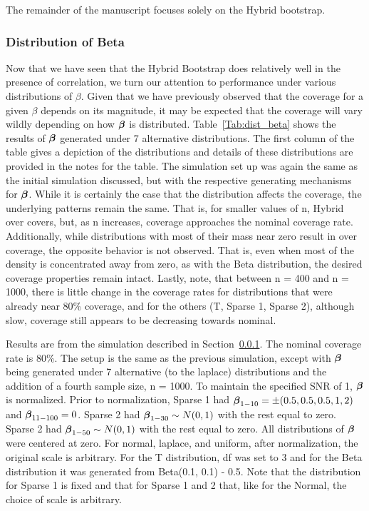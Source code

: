 The remainder of the manuscript focuses solely on the Hybrid bootstrap.

\subsubsection{Distribution of Beta}\label{Sec:Distribution}

Now that we have seen that the Hybrid Bootstrap does relatively well in the presence of correlation, we turn our attention to performance under various distributions of $\beta$. Given that we have previously observed that the coverage for a given $\beta$ depends on its magnitude, it may be expected that the coverage will vary wildly depending on how $\boldsymbol{\beta}$ is distributed. Table~\ref{Tab:dist_beta} shows the results of $\boldsymbol{\beta}$ generated under 7 alternative distributions. The first column of the table gives a depiction of the distributions and details of these distributions are provided in the notes for the table. The simulation set up was again the same as the initial simulation discussed, but with the respective generating mechanisms for $\boldsymbol{\beta}$. While it is certainly the case that the distribution affects the coverage, the underlying patterns remain the same. That is, for smaller values of n, Hybrid over covers, but, as n increases, coverage approaches the nominal coverage rate. Additionally, while distributions with most of their mass near zero result in over coverage, the opposite behavior is not observed. That is, even when most of the density is concentrated away from zero, as with the Beta distribution, the desired coverage properties remain intact. Lastly, note, that between n = 400 and n = 1000, there is little change in the coverage rates for distributions that were already near 80\% coverage, and for the others (T, Sparse 1, Sparse 2), although slow, coverage still appears to be decreasing towards nominal.

\begin{table}[hbtp]
  \centering
  
  \caption{\label{Tab:dist_beta} Results are from the simulation described in Section~\ref{Sec:Distribution}. The nominal coverage rate is 80\%. The setup is the same as the previous simulation, except with $\boldsymbol{\beta}$ being generated under 7 alternative (to the laplace) distributions and the addition of a fourth sample size, n = 1000. To maintain the specified SNR of 1, $\boldsymbol{\beta}$ is normalized. Prior to normalization, Sparse 1 had $\boldsymbol{\beta}_{1-10} = \pm(0.5, 0.5, 0.5, 1, 2)$ and $\boldsymbol{\beta}_{11-100} = 0$. Sparse 2 had $\boldsymbol{\beta}_{1-30} \sim N(0, 1)$ with the rest equal to zero.  Sparse 2 had $\boldsymbol{\beta}_{1-50} \sim N(0, 1)$ with the rest equal to zero. All distributions of $\boldsymbol{\beta}$ were centered at zero. For normal, laplace, and uniform, after normalization, the original scale is arbitrary. For the T distribution, df was set to 3 and for the Beta distribution it was generated from Beta(0.1, 0.1) - 0.5. Note that the distribution for Sparse 1 is fixed and that for Sparse 1 and 2 that, like for the Normal, the choice of scale is arbitrary.}
\end{table}

